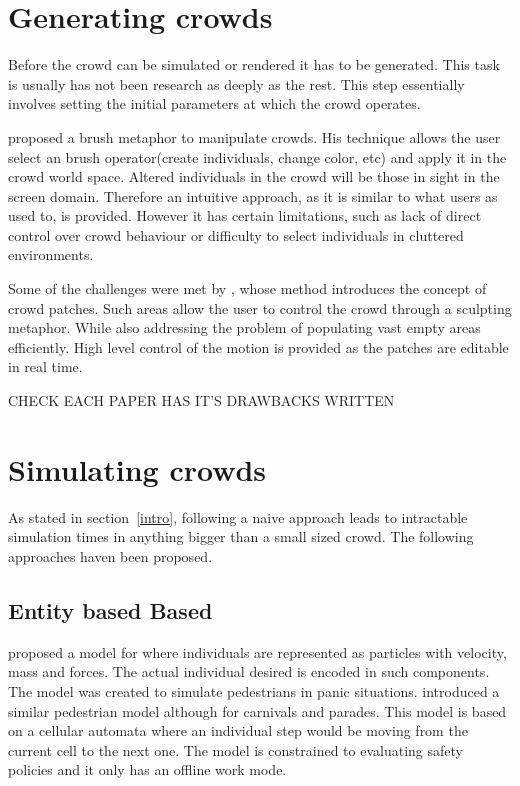 \documentclass[11pt,twocolumn]{article}
\numberwithin{equation}{section} %
\numberwithin{figure}{section} %
\numberwithin{table}{section} %
\begin{document}
\section{Generating crowds}

Before the crowd can be simulated or rendered it has to be generated.
This task is usually has not been research as deeply as the rest.
This step essentially involves setting the initial parameters at which the crowd operates.

\cite{Ulicny2004} proposed a brush metaphor to manipulate crowds.
His technique allows the user select an brush operator(create individuals, change color, etc) and apply it in the crowd world space.
Altered individuals in the crowd will be those in sight in the screen domain.
Therefore an intuitive approach, as it is similar to what users as used to, is provided.
However it has certain limitations, such as lack of direct control over crowd behaviour or difficulty to select individuals in cluttered environments.

Some of the challenges were met by \cite{Jordao2014}, whose method introduces the concept of crowd patches.
Such areas allow the user to control the crowd through a sculpting metaphor.
While also addressing the problem of populating vast empty areas efficiently.
High level control of the motion is provided as the patches are editable in real time.

CHECK EACH PAPER HAS IT'S DRAWBACKS WRITTEN

\section{Simulating crowds}

As stated in section~\ref{intro}, following a naive approach leads to intractable simulation times in anything bigger than a small sized crowd.
The following approaches haven been proposed.

\subsection{Entity based Based}

\cite{Helbing2000} proposed a model for where individuals are represented as particles with velocity, mass and forces.
The actual individual desired is encoded in such components.
The model was created to simulate pedestrians in panic situations.
\cite{batty2003} introduced a similar pedestrian model although for carnivals and parades.
This model is based on a cellular automata where an individual step would be moving from the current cell to the next one.
The model is constrained to evaluating safety policies and it only has an offline work mode.
\end{document}
